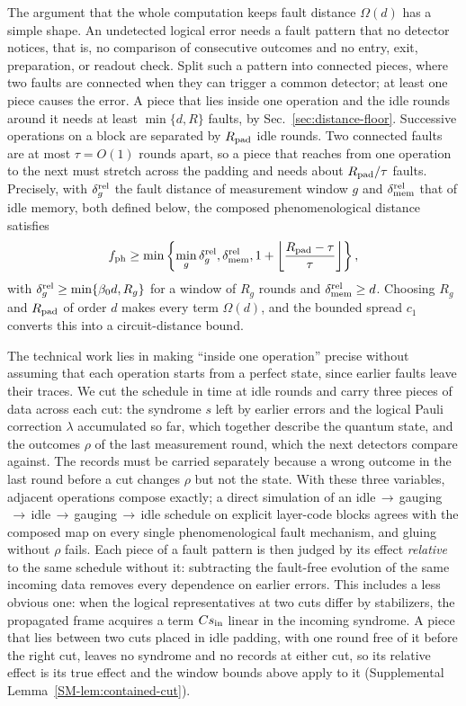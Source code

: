The argument that the whole computation keeps fault distance $\Omega(d)$ has
a simple shape.  An undetected logical error needs a fault pattern that no
detector notices, that is, no comparison of consecutive outcomes and no
entry, exit, preparation, or readout check.  Split such a pattern into
connected pieces, where two faults are connected when they can trigger a
common detector; at least one piece causes the error.  A piece that lies
inside one operation and the idle rounds around it needs at least
$\min\{d,R\}$ faults, by Sec.~\ref{sec:distance-floor}.  Successive operations
on a block are separated by $R_{\rm pad}$ idle rounds.  Two connected faults
are at most $\tau=O(1)$ rounds apart, so a piece that reaches from one
operation to the next must stretch across the padding and needs about
$R_{\rm pad}/\tau$ faults.  Precisely, with $\delta_g^{\rm rel}$ the fault
distance of measurement window $g$ and $\delta_{\rm mem}^{\rm rel}$ that of
idle memory, both defined below, the composed phenomenological distance
satisfies
\begin{equation}
 f_{\rm ph}\ge\min\left\{
 \min_g\delta_g^{\rm rel},\delta_{\rm mem}^{\rm rel},
 1+\left\lfloor\frac{R_{\rm pad}-\tau}{\tau}\right\rfloor
 \right\},
 \label{eq:composition}
\end{equation}
with $\delta_g^{\rm rel}\ge\min\{\beta_0d,R_g\}$ for a window of $R_g$ rounds
and $\delta_{\rm mem}^{\rm rel}\ge d$.  Choosing $R_g$ and $R_{\rm pad}$ of
order $d$ makes every term $\Omega(d)$, and the bounded spread $c_1$ converts
this into a circuit-distance bound.

The technical work lies in making ``inside one operation'' precise without
assuming that each operation starts from a perfect state, since earlier
faults leave their traces.  We cut the schedule in time at idle rounds and
carry three pieces of data across each cut: the syndrome $s$ left by earlier
errors and the logical Pauli correction $\lambda$ accumulated so far, which
together describe the quantum state, and the outcomes $\rho$ of the last
measurement round, which the next detectors compare against.  The records
must be carried separately because a wrong outcome in the last round before
a cut changes $\rho$ but not the state.  With these three variables, adjacent
operations compose exactly; a direct simulation of an
idle$\,\to\,$gauging$\,\to\,$idle$\,\to\,$gauging$\,\to\,$idle schedule on
explicit layer-code blocks agrees with the composed map on every single
phenomenological fault mechanism, and gluing without $\rho$ fails.  Each
piece of a fault pattern is then judged by its effect \emph{relative} to the
same schedule without it: subtracting the fault-free evolution of the same
incoming data removes every dependence on earlier errors.  This includes a
less obvious one: when the logical representatives at two cuts differ by
stabilizers, the propagated frame acquires a term $Cs_{\rm in}$ linear in the
incoming syndrome.  A piece that lies between two cuts placed in idle
padding, with one round free of it before the right cut, leaves no syndrome
and no records at either cut, so its relative effect is its true effect and the window bounds
above apply to it (Supplemental Lemma~\ref{SM-lem:contained-cut}).

